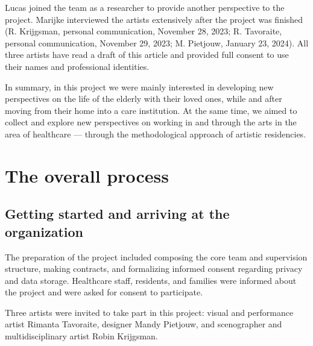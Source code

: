 \documentclass[authordate, empirical]{jote-new-article}
\begin{document}
Lucas joined the team as a researcher to provide another perspective to the project. Marijke interviewed the artists extensively after the project was finished (R. Krijgsman, personal communication, November 28, 2023; R. Tavoraite, personal communication, November 29, 2023; M. Pietjouw, January 23, 2024). All three artists have read a draft of this article and provided full consent to use their names and professional identities.
	

	





	In summary, in this project we were mainly interested in developing new perspectives on the life of the elderly with their loved ones, while and after moving from their home into a care institution. At the same time, we aimed to collect and explore new perspectives on working in and through the arts in the area of healthcare --- through the methodological approach of artistic residencies.







	\section{The overall process}



	\subsection{Getting started and arriving at the organization }



	The preparation of the project included composing the core team and supervision structure, making contracts, and formalizing informed consent regarding privacy and data storage. Healthcare staff, residents, and families were informed about the project and were asked for consent to participate.







	Three artists were invited to take part in this project: visual and performance artist Rimanta Tavoraite, designer Mandy Pietjouw, and scenographer and multidisciplinary artist Robin Krijgsman.
\end{document}
